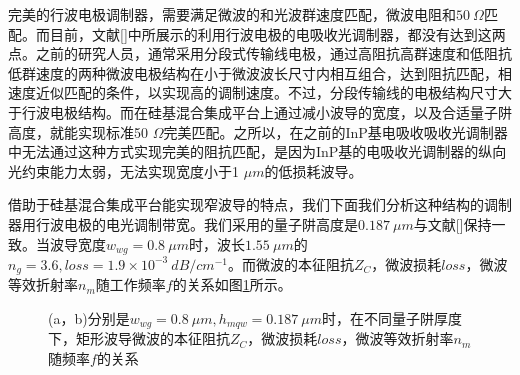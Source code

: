 完美的行波电极调制器，需要满足微波的和光波群速度匹配，微波电阻和$50~\Omega$匹配。而目前，文献[]中所展示的利用行波电极的电吸收光调制器，都没有达到这两点。之前的研究人员，通常采用分段式传输线电极，通过高阻抗高群速度和低阻抗低群速度的两种微波电极结构在小于微波波长尺寸内相互组合，达到阻抗匹配，相速度近似匹配的条件，以实现高的调制速度\cite{tang2012over,yuphd,Robertphd}。不过，分段传输线的电极结构尺寸大于行波电极结构。而在硅基混合集成平台上通过减小波导的宽度，以及合适量子阱高度，就能实现标准50 $\Omega$完美匹配。之所以，在之前的InP基电吸收吸收光调制器中无法通过这种方式实现完美的阻抗匹配，是因为InP基的电吸收光调制器的纵向光约束能力太弱，无法实现宽度小于1 $\mu m$的低损耗波导。

借助于硅基混合集成平台能实现窄波导的特点，我们下面我们分析这种结构的调制器用行波电极的电光调制带宽。我们采用的量子阱高度是$0.187~ \mu m$与文献[]保持一致。当波导宽度$w_{wg} = 0.8~ \mu m$时，波长$1.55~ \mu m$的$n_g = 3.6, loss = 1.9 \times 10^{-3} ~dB/cm^{-1} $。而微波的本征阻抗$Z_C$，微波损耗$loss$，微波等效折射率$n_m$随工作频率$f$的关系如图\ref{fig_ch2_rect_freq_property}所示。
\begin{figure}[htb]
	\small
\caption{(a，b)分别是$w_{wg} = 0.8 ~\mu m, h_{mqw} = 0.187 ~\mu m$时，在不同量子阱厚度下，矩形波导微波的本征阻抗$Z_C$，微波损耗$loss$，微波等效折射率$n_m$随频率$f$的关系}
\label{fig_ch2_rect_freq_property}	
\end{figure}


